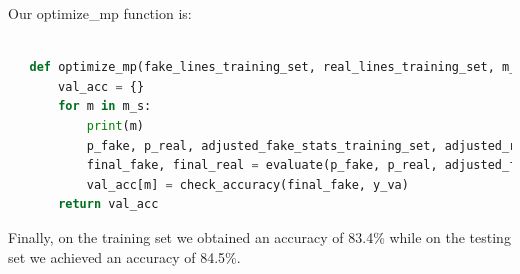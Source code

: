 \documentclass{article}
\begin{document}
   Our optimize\_mp function is:
   \begin{lstlisting}[language=Python]

   def optimize_mp(fake_lines_training_set, real_lines_training_set, m_s, mp):
       val_acc = {}
       for m in m_s:
           print(m)
           p_fake, p_real, adjusted_fake_stats_training_set, adjusted_real_stats_training_set = training_part(fake_lines_training_set, real_lines_training_set, m, mp)
           final_fake, final_real = evaluate(p_fake, p_real, adjusted_fake_stats_training_set, adjusted_real_stats_training_set, validation_set)
           val_acc[m] = check_accuracy(final_fake, y_va)
       return val_acc
   \end{lstlisting}

   Finally, on the training set we obtained an accuracy of 83.4\% while on the testing set
   we achieved an accuracy of 84.5\%.
\end{document}
